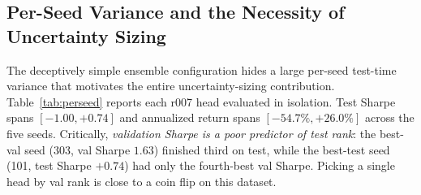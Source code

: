 \documentclass[conference]{IEEEtran}
\begin{document}
\begin{table}[t]
  \centering
  \caption{Component ablation on the OOS test split. Rows A--B
  use 731 days; rows C--G use 691 days (post-2022).}
  \label{tab:ablation}
\end{table}

\subsection{Per-Seed Variance and the Necessity of Uncertainty Sizing}
\label{sec:results-perseed}

The deceptively simple ensemble configuration hides a large per-seed
test-time variance that motivates the entire uncertainty-sizing
contribution. Table~\ref{tab:perseed} reports each r007 head evaluated
in isolation. Test Sharpe spans $[-1.00, +0.74]$ and annualized return
spans $[-54.7\%, +26.0\%]$ across the five seeds. Critically,
\emph{validation Sharpe is a poor predictor of test rank}: the best-val
seed (303, val Sharpe $1.63$) finished third on test, while the
best-test seed (101, test Sharpe $+0.74$) had only the fourth-best val
Sharpe. Picking a single head by val rank is close to a coin flip on
this dataset.
\end{document}
